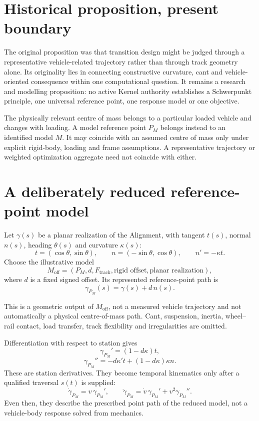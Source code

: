 \section{Historical proposition, present boundary}

The original proposition was that transition design might be judged through a
representative vehicle-related trajectory rather than through track geometry
alone. Its originality lies in connecting constructive curvature, cant and
vehicle-oriented consequence within one computational question. It remains a
research and modelling proposition: no active Kernel authority establishes a
Schwerpunkt principle, one universal reference point, one response model or one
objective.

The physically relevant centre of mass belongs to a particular loaded vehicle
and changes with loading. A model reference point \(P_M\) belongs instead to an
identified model \(M\). It may coincide with an assumed centre of mass only
under explicit rigid-body, loading and frame assumptions. A representative
trajectory or weighted optimization aggregate need not coincide with either.

\section{A deliberately reduced reference-point model}

Let \(\gamma(s)\) be a planar realization of the Alignment, with tangent
\(t(s)\), normal \(n(s)\), heading \(\theta(s)\) and curvature \(\kappa(s)\):
\[
t=(\cos\theta,\sin\theta),\qquad
n=(-\sin\theta,\cos\theta),\qquad n'=-\kappa t.
\]
Choose the illustrative model
\[
M_{\mathrm{off}}=(P_M,d,F_{\mathrm{track}},
\text{rigid offset},\text{planar realization}),
\]
where \(d\) is a fixed signed offset. Its represented reference-point path is
\[
\gamma_{P_M}(s)=\gamma(s)+d\,n(s).
\]

This is a geometric output of \(M_{\mathrm{off}}\), not a measured vehicle
trajectory and not automatically a physical centre-of-mass path. Cant,
suspension, inertia, wheel--rail contact, load transfer, track flexibility and
irregularities are omitted.

Differentiation with respect to station gives
\[
\gamma_{P_M}'=(1-d\kappa)t,
\]
\[
\gamma_{P_M}''
=-d\kappa't+(1-d\kappa)\kappa n.
\]
These are station derivatives. They become temporal kinematics only after a
qualified traversal \(s(t)\) is supplied:
\[
\dot\gamma_{P_M}=v\,\gamma_{P_M}',\qquad
\ddot\gamma_{P_M}=\dot v\,\gamma_{P_M}'+v^2\gamma_{P_M}''.
\]
Even then, they describe the prescribed point path of the reduced model, not a
vehicle-body response solved from mechanics.

